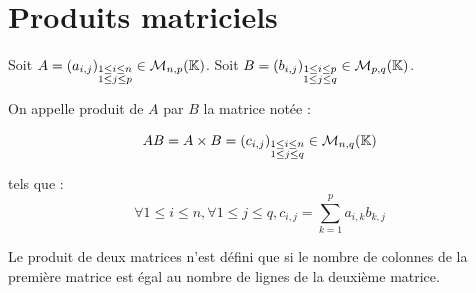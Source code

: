 \documentclass[12pt, a4paper]{report}
\begin{document}
\section{Produits matriciels}

\begin{definition}
    Soit $A = (a_{i,j})_{\substack{1 \le i \le n \\ 1 \le j \le p}} \in \mathcal M_{n,p}(\mathbb{K})$.
    Soit $B = (b_{i,j})_{\substack{1 \le i \le p \\ 1 \le j \le q}} \in \mathcal M_{p,q}(\mathbb{K})$.
    
    On appelle produit de $A$ par $B$ la matrice notée :
    
    $$AB = A\times B = (c_{i,j})_{\substack{1 \le i \le n \\ 1 \le j \le q}} \in \mathcal M_{n,q}(\mathbb{K})$$
    
    tels que : 
    $$\forall 1 \le i \le n, \forall 1 \le j \le q, c_{i,j} = \sum_{k=1}^p a_{i,k} b_{k,j}$$
\end{definition}

\begin{attention}
    Le produit de deux matrices n'est défini que si le nombre de colonnes de la première matrice est égal au nombre de lignes de la deuxième matrice.
\end{attention}
\end{document}

